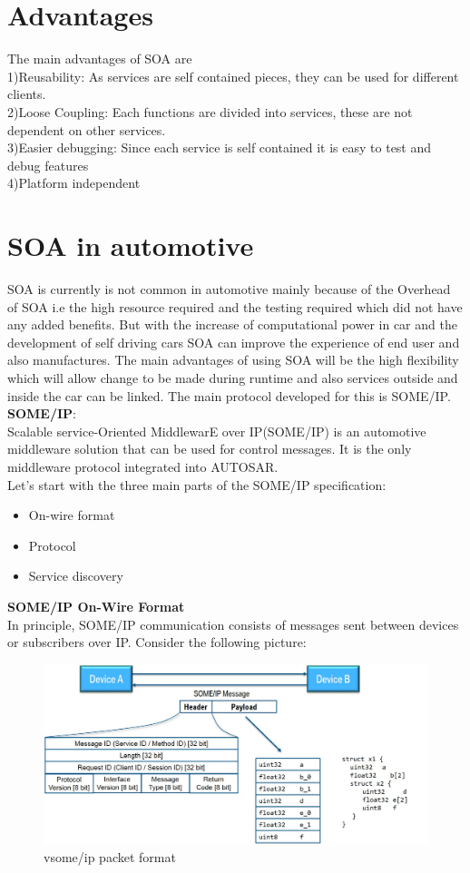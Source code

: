 \documentclass{fisattraining}
\begin{document}
\section{Advantages}
The main advantages of SOA are\\
  1)Reusability: As services are self contained pieces, they can be used for different clients.\\
  2)Loose Coupling: Each functions are divided into services, these are not dependent on other services.\\
  3)Easier debugging: Since each service is self contained it is easy to test and debug features\\
  4)Platform independent

\section{SOA in automotive}
SOA is currently is not common in automotive mainly because of the Overhead of SOA i.e the high resource required and the testing required which did not have any added benefits. But with the increase of computational power in car and the development of self driving cars SOA can improve the experience of end user and also manufactures. The main advantages of using SOA will be the high flexibility which will allow change to be made during runtime and also services outside and inside the car can be linked. The main protocol developed for this is SOME/IP.\\
\textbf{SOME/IP}:\\
Scalable service-Oriented MiddlewarE over IP(SOME/IP) is an automotive middleware solution that can be used for control messages. It is the only middleware protocol integrated into AUTOSAR.\\
Let's start with the three main parts of the SOME/IP specification:
\begin{itemize}
\item On-wire format
\item Protocol
\item Service discovery
\end{itemize}
\textbf{SOME/IP On-Wire Format}\\
In principle, SOME/IP communication consists of messages sent between devices or subscribers over IP. Consider the following picture:
\begin{figure}[h!]
\begin{center}
\includegraphics[scale=.5]{SOMEIPOnWireFormat}
\caption{vsome/ip packet format}
\end{center}
\end{figure}\\
\end{document}
